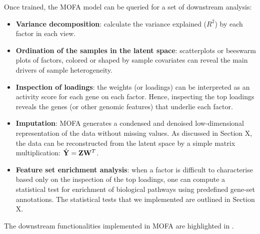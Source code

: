 Once trained, the MOFA model can be queried for a set of downstream analysis:
\begin{itemize}
	\item \textbf{Variance decomposition}: calculate the variance explained ($R^2$) by each factor in each view. 
	\item \textbf{Ordination of the samples in the latent space}: scatterplots or beeswarm plots of factors, colored or shaped by sample covariates can reveal the main drivers of sample heterogeneity.
	\item \textbf{Inspection of loadings}: the weights (or loadings) can be interpreted as an activity score for each gene on each factor. Hence, inspecting the top loadings reveals the genes (or other genomic features) that underlie each factor.
	\item \textbf{Imputation}: MOFA generates a condensed and denoised low-dimensional representation of the data without missing values. As discussed in Section X, the data can be reconstructed from the latent space by a simple matrix multiplication: $\hat{{\bf Y}} = {\bf Z} {\bf W}^T$. 
	\item \textbf{Feature set enrichment analysis}: when a factor is difficult to characterise based only on the inspection of the top loadings, one can compute a statistical test for enrichment of biological pathways using predefined gene-set annotations. The statistical tests that we implemented are outlined in Section X.
\end{itemize}

The downstream functionalities implemented in MOFA are highlighted in .

